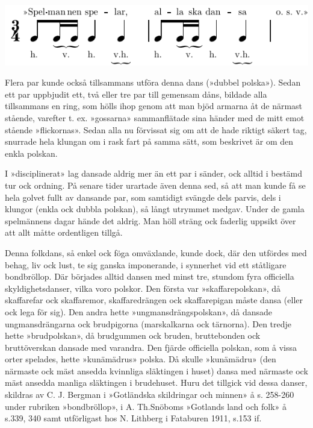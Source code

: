 {\vspace{0.6cm}
\includegraphics{include/snippets/spelmannen-spelar-crop.pdf}
\vspace{0.3cm}

Flera par kunde också tillsammans utföra denna dans (»dubbel polska»). Sedan ett par uppbjudit ett, två eller tre par till gemensam dåns, bildade alla tillsammans en ring, som hölls ihop genom att man bjöd armarna åt de närmast stående, varefter t. ex. »gossarna» sammanflätade sina händer med de mitt emot stående »flickornas». Sedan alla nu förvissat sig om att de hade riktigt säkert tag, snurrade hela klungan om i rask fart på samma sätt, som beskrivet är om den enkla polskan.

I »disciplinerat» lag dansade aldrig mer än ett par i sänder, ock alltid i bestämd tur ock ordning. På senare tider urartade även denna sed, så att man kunde få se hela golvet fullt av dansande par, som samtidigt svängde dels parvis, dels i klungor (enkla ock dubbla polskan), så långt utrymmet medgav. Under de gamla spelmännens dagar hände det aldrig. Man höll sträng ock faderlig uppsikt över att allt måtte ordentligen tillgå.

Denna folkdans, så enkel ock föga omväxlande, kunde dock, där den utfördes med behag, liv ock lust, te sig ganska imponerande, i synnerhet vid ett ståtligare bondbröllop. Där börjades alltid dansen med minst tre, stundom fyra officiella skyldighetsdanser, vilka voro polskor. Den första var »skaffarepolskan», då skaffarefar ock skaffaremor, skaffaredrängen ock skaffarepigan måste dansa (eller ock lega för sig). Den andra hette »ungmansdrängspolskan», då dansade ungmansdrängarna ock brudpigorna (marskalkarna ock tärnorna). Den tredje hette »brudpolskan», då brudgummen ock bruden, bruttebonden ock bruttöverskan dansade med varandra. Den fjärde officiella polskan, som å vissa orter spelades, hette »kunämädrus» polska. Då skulle »kunämädru» (den närmaste ock mäst ansedda
kvinnliga släktingen i huset) dansa med närmaste ock mäst ansedda manliga släktingen i brudehuset. Huru det tillgick vid dessa danser, skildras av C. J. Bergman i »Gotländska skildringar och minnen» å s. 258-260 under rubriken »bondbröllop», i A. Th.\@ Snöboms »Gotlands land och folk» å s.\@ 339, 340 samt utförligast hos N. Lithberg i Fataburen 1911, s.\@ 153 if.

}
